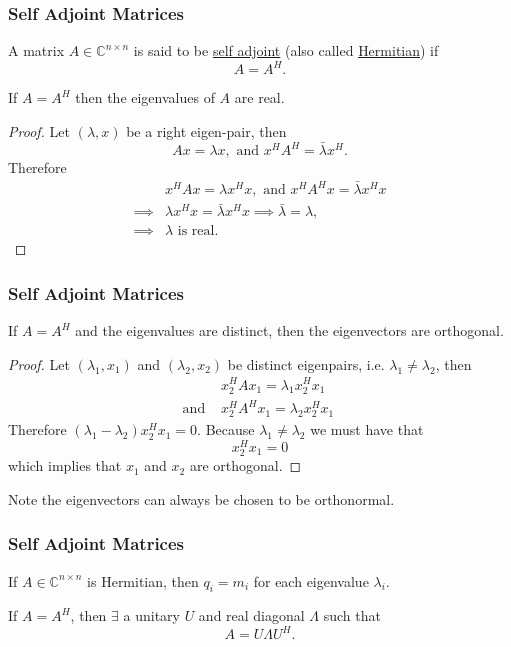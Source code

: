 \documentclass{beamer}
\begin{document}
\begin{frame}\frametitle{Self Adjoint Matrices}
	\begin{definition}
	A matrix $A\in\mathbb{C}^{n\times n}$ is said to be \underline{self adjoint} (also called \underline{Hermitian}) if 
	\[
		A = A^H.
	\]	
	\end{definition}
	
	\begin{lemma}[Moon 6.2]
 		If $A = A^H$ then the eigenvalues of $A$ are real.
	\end{lemma}
	\begin{proof}
		Let $(\lambda,x)$ be a right eigen-pair, then
		\[ 
			Ax = \lambda x, \text{ and } x^HA^H = \bar{\lambda}x^H.
		\]
		Therefore 
		\begin{align*}
			& x^HAx = \lambda x^Hx, \text{ and } x^HA^Hx = \bar{\lambda}x^Hx \\
			\implies & \lambda x^Hx = \bar{\lambda}x^Hx  
			\implies  \bar{\lambda} = \lambda, \\
			\implies & \lambda \text{ is real. }	
		\end{align*}
	\end{proof}
\end{frame}

\begin{frame}\frametitle{Self Adjoint Matrices}
	\begin{lemma}[Moon 6.3]
		If $A=A^H$ and the eigenvalues are distinct, then the eigenvectors are orthogonal.
	\end{lemma}
	
	\begin{proof}
	Let $(\lambda_1,x_1)$ and $(\lambda_2,x_2)$ be distinct eigenpairs, i.e. $\lambda_1 \neq \lambda_2$, then
	\begin{align*}
		& x_2^HAx_1 = \lambda_1x_2^Hx_1 \\
		\text{and~} & x_2^HA^Hx_1 = \lambda_2x_2^Hx_1 \
	\end{align*}
	Therefore $(\lambda_1-\lambda_2)x_2^Hx_1 = 0$.
	Because $\lambda_1 \neq \lambda_2$ we must have that
	\[
		x_2^Hx_1 = 0
	\]
	which implies that $x_1$ and $x_2$ are orthogonal.
	\end{proof}
	{\color{blue}
		Note the eigenvectors can always be chosen to be orthonormal.
	}
\end{frame}

\begin{frame}\frametitle{Self Adjoint Matrices}

	\begin{theorem}
		If $A\in\mathbb{C}^{n\times n}$ is Hermitian,
		then $q_i = m_i$ for each eigenvalue $\lambda_i$.
	\end{theorem}
	
	\begin{corollary}
		If $A=A^H$, then $\exists$ a unitary $U$ and real diagonal $\Lambda$ such that
		\[
			A = U \Lambda U^H.
		\]
	\end{corollary}
	
\end{frame}
\end{document}
